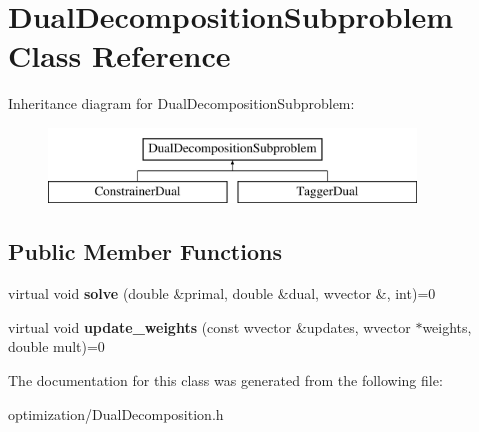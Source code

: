 \hypertarget{class_dual_decomposition_subproblem}{
\section{DualDecompositionSubproblem Class Reference}
\label{class_dual_decomposition_subproblem}
}
Inheritance diagram for DualDecompositionSubproblem:\begin{figure}[H]
\begin{center}
\leavevmode
\includegraphics[height=2cm]{class_dual_decomposition_subproblem}
\end{center}
\end{figure}
\subsection*{Public Member Functions}
\begin{DoxyCompactItemize}
\item 
\hypertarget{class_dual_decomposition_subproblem_aac234786c13091898be348dc0056a036}{
virtual void {\bfseries solve} (double \&primal, double \&dual, wvector \&, int)=0}
\label{class_dual_decomposition_subproblem_aac234786c13091898be348dc0056a036}

\item 
\hypertarget{class_dual_decomposition_subproblem_a6d26fcb23023d5b03d54b3d191531b02}{
virtual void {\bfseries update\_\-weights} (const wvector \&updates, wvector $\ast$weights, double mult)=0}
\label{class_dual_decomposition_subproblem_a6d26fcb23023d5b03d54b3d191531b02}

\end{DoxyCompactItemize}


The documentation for this class was generated from the following file:\begin{DoxyCompactItemize}
\item 
optimization/DualDecomposition.h\end{DoxyCompactItemize}
